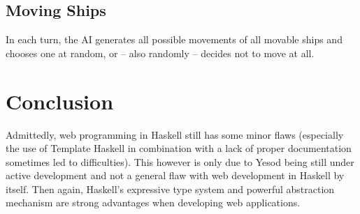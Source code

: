 \documentclass[a4paper]{easychair}
\begin{document}
\subsection{Moving Ships}
In each turn, the AI generates all possible movements of all movable ships and chooses one at random, or -- also randomly -- decides not to move at all. %

\section{Conclusion}

Admittedly, web programming in Haskell still has some minor flaws (especially the use of Template Haskell in combination with a lack of proper documentation sometimes led to difficulties). This however is only due to Yesod being still under active development and not a general flaw with web development in Haskell by itself. Then again, Haskell's expressive type system and powerful abstraction mechanism are strong advantages when developing web applications.


%
\label{sect:bib}

%
%
%
%


\end{document}
